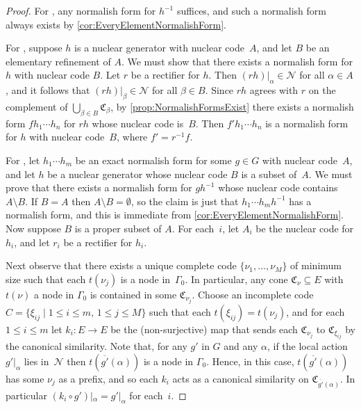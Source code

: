 \documentclass[11pt,letterpaper]{amsart}
\theoremstyle{definition}
\newcommand{\Nuc}{\mathcal{N}}
\newcommand{\C}{\mathfrak{C}}
\begin{document}
\begin{proof}
For \Inv, any normalish form for $h^{-1}$ suffices, and such a normalish form always exists by \cref{cor:EveryElementNormalishForm}.

For \Refine, suppose $h$ is a nuclear generator with nuclear code~$A$, and let $B$ be an elementary refinement of $A$. We must show that there exists a normalish form for $h$ with nuclear code $B$. Let $r$ be a rectifier for $h$.  Then $(rh)|_\alpha\in \Nuc$ for all $\alpha\in A$, and it follows that $(rh)|_\beta\in\Nuc$ for all $\beta\in B$.  Since $rh$ agrees with $r$ on the complement of $\bigcup_{\beta\in B} \C_\beta$, by \cref{prop:NormalishFormsExist} there exists a normalish form $fh_1\cdots h_n$ for $rh$ whose nuclear code is~$B$.  Then $f'h_1\cdots h_n$ is a normalish form for $h$ with nuclear code~$B$, where $f'=r^{-1}f$.

For \Prod, let $h_1\cdots h_m$ be an exact normalish form for some $g\in G$ with nuclear code~$A$, and let $h$ be a nuclear generator whose nuclear code $B$ is a subset of~$A$. We must prove that there exists a normalish form for $gh^{-1}$ whose nuclear code contains $A\setminus B$.  If $B=A$ then $A\setminus B=\emptyset$, so the claim is just that $h_1\cdots h_mh^{-1}$ has a normalish form, and this is immediate from \cref{cor:EveryElementNormalishForm}. Now suppose $B$ is a proper subset of $A$. For each~$i$, let $A_i$ be the nuclear code for $h_i$, and let $r_i$ be a rectifier for $h_i$. 

Next observe that there exists a unique complete code $\{\nu_1,\ldots,\nu_M\}$ of minimum size such that each $t(\nu_j)$ is a node in~$\Gamma_0$.  In particular, any cone $\C_\nu\subseteq E$ with $t(\nu)$ a node in $\Gamma_0$ is contained in some $\C_{\nu_j}$. Choose an incomplete code $C=\{\xi_{ij}\mid 1\le i\leq m\text{, } 1\le j\leq M\}$ such that each $t(\xi_{ij})=t(\nu_j)$, and for each $1\leq i\leq m$ let $k_i\colon E\to E$ be the (non-surjective) map that sends each $\C_{\nu_j}$ to $\C_{\xi_{ij}}$ by the canonical similarity.  Note that, for any $g'$ in $G$ and any $\alpha$, if the local action $g'|_{\alpha}$ lies in~$\Nuc$ then $t(\overline{g'}(\alpha))$ is a node in $\Gamma_0$. Hence, in this case, $t(\overline{g'}(\alpha))$ has some $\nu_j$ as a prefix, and so each $k_i$ acts as a canonical similarity on $\C_{\overline{g'}(\alpha)}$. In particular $(k_i\circ g')|_{\alpha}=g'|_\alpha$ for each~$i$. 


\end{proof}
\end{document}
